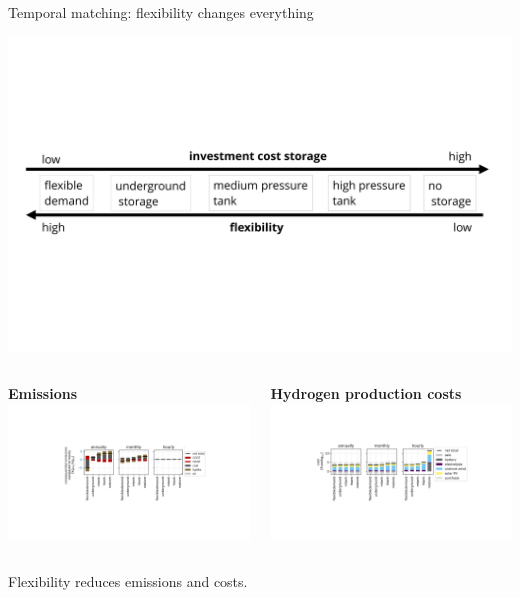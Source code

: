 \begin{frame}{Temporal matching: flexibility changes everything}
	\addtocounter{framenumber}{-1}
	\vspace{-1cm} 
	\centering
	\includegraphics[width=0.6\linewidth, clip, trim={0cm 5cm 0cm 5cm}]{images/store_flexibility_v2}
	\begin{columns}[t]
		\begin{column}{0.5\textwidth}
			\centering
				\textbf{Emissions} \\
				\includegraphics[width=1\linewidth, clip, trim={5cm 4cm 5cm 4cm}]{images/emissions_flexibility}
		\end{column}
		\begin{column}{0.5\textwidth}
				\textbf{Hydrogen production costs} \\
				\includegraphics[width=1\linewidth, clip, trim={5cm 4cm 5cm 4cm}]{images/costs_flexibility}
		\end{column}
	\end{columns}

	Flexibility \alert{reduces} emissions and costs.
\end{frame}

